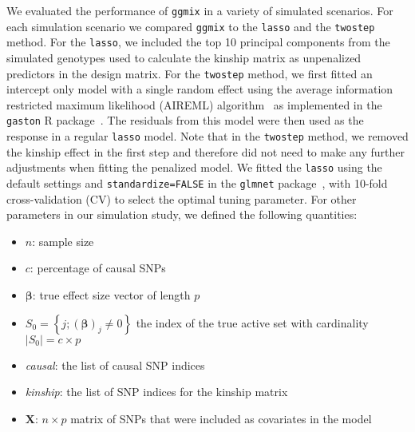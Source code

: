 \documentclass[10pt,letterpaper]{article}
\newcommand{\bX}{\textbf{X}}
\newcommand{\bbeta}{\boldsymbol{\beta}}
\begin{document}
We evaluated the performance of \texttt{ggmix} in a variety of simulated scenarios. For each simulation scenario we compared \texttt{ggmix} to the \texttt{lasso} and the \texttt{twostep} method. For the \texttt{lasso}, we included the top 10 principal components from the simulated genotypes used to calculate the kinship matrix as unpenalized predictors in the design matrix. For the \texttt{twostep} method, we first fitted an intercept only model with a single random effect using the average information restricted maximum likelihood (AIREML) algorithm~\cite{gilmour1995average} as implemented in the \texttt{gaston} R package~\cite{gaston}. The residuals from this model were then used as the response in a regular \texttt{lasso} model. Note that in the \texttt{twostep} method, we removed the kinship effect in the first step and therefore did not need to make any further adjustments when fitting the penalized model. We fitted the \texttt{lasso} using the default settings and \texttt{standardize=FALSE} in the \texttt{glmnet} package~\cite{friedman2010regularization}, with 10-fold cross-validation (CV) to select the optimal tuning parameter. For other parameters in our simulation study, we defined the following quantities:

\begin{itemize}
	\item $n$: sample size
	\item $c$: percentage of causal SNPs
	\item $\bbeta$: true effect size vector of length $p$ 
	\item $S_0 = \left\lbrace j; (\bbeta)_j \neq 0 \right\rbrace$ the index of the true active set with cardinality $ |S_0| = c\times p$
	\item \textit{causal}: the list of causal SNP indices
	\item \textit{kinship}: the list of SNP indices for the kinship matrix
	\item $\bX$: $n \times p$ matrix of SNPs that were included as covariates in the model
\end{itemize}
\end{document}
